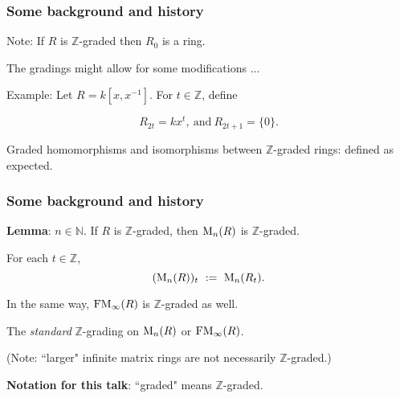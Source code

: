 \documentclass{beamer}
\begin{document}
\begin{frame}
\frametitle{Some background and history}

Note:   If $R$ is $\mathbb{Z}$-graded then $R_0$ is a ring.   




\bigskip

\pause

The gradings might allow for some modifications ...



\bigskip


Example:   Let  $R = k[x,x^{-1}]$.   For  $t\in \mathbb{Z}$,    define  

\medskip

$$R_{2t} = kx^t, \ \mbox{and}   \ R_{2t+1} = \{0\} .$$




\bigskip
\pause

Graded homomorphisms and isomorphisms between $\mathbb{Z}$-graded rings:  defined  as expected.   




\end{frame}

\begin{frame}
\frametitle{Some background and history}

{\bf Lemma}:   $n \in \mathbb{N}$.   If $R$ is $\mathbb{Z}$-graded, then ${\rm M}_n(R)$ is  $\mathbb{Z}$-graded.  

\medskip

 For each $t \in \mathbb{Z}$, 
$$ ({\rm M}_n(R))_t \ := \ {\rm M}_n(R_t).$$


\medskip

In the same way, ${\rm FM}_\infty(R)$ is $\mathbb{Z}$-graded as well.    



\bigskip

The {\it standard}  $\mathbb{Z}$-grading on ${\rm M}_n(R)$ or  ${\rm FM}_\infty(R)$.  


\pause

\medskip

(Note:  ``larger" infinite matrix rings are not necessarily $\mathbb{Z}$-graded.)  

\bigskip
\pause

{\bf Notation for this talk}:   ``graded"  means $\mathbb{Z}$-graded.   



\end{frame}
\end{document}
